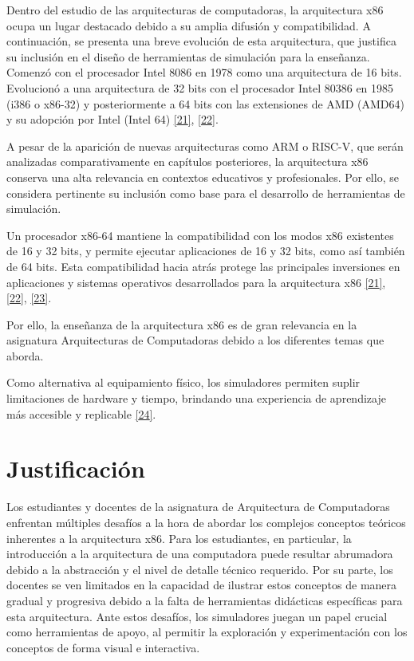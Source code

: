 \documentclass[12pt,oneside]{templates/unerthesis}
\begin{document}
Dentro del estudio de las arquitecturas de computadoras, la arquitectura x86 ocupa un lugar destacado debido a su amplia difusión y compatibilidad. A continuación, se presenta una breve evolución de esta arquitectura, que justifica su inclusión en el diseño de herramientas de simulación para la enseñanza. Comenzó con el procesador Intel 8086 en 1978 como una arquitectura de 16 bits. Evolucionó a una arquitectura de 32 bits con el procesador Intel 80386 en 1985 (i386 o x86-32) y posteriormente a 64 bits con las extensiones de AMD (AMD64) y su adopción por Intel (Intel 64) \protect\hyperlink{ref-intel_64_2025}{{[}21{]}}, \protect\hyperlink{ref-amd_developer_2024}{{[}22{]}}.

A pesar de la aparición de nuevas arquitecturas como ARM o RISC-V, que serán analizadas comparativamente en capítulos posteriores, la arquitectura x86 conserva una alta relevancia en contextos educativos y profesionales. Por ello, se considera pertinente su inclusión como base para el desarrollo de herramientas de simulación.

Un procesador x86-64 mantiene la compatibilidad con los modos x86 existentes de 16 y 32 bits, y permite ejecutar aplicaciones de 16 y 32 bits, como así también de 64 bits. Esta compatibilidad hacia atrás protege las principales inversiones en aplicaciones y sistemas operativos desarrollados para la arquitectura x86 \protect\hyperlink{ref-intel_64_2025}{{[}21{]}}, \protect\hyperlink{ref-amd_developer_2024}{{[}22{]}}, \protect\hyperlink{ref-abel_ibm_2000}{{[}23{]}}.

Por ello, la enseñanza de la arquitectura x86 es de gran relevancia en la asignatura Arquitecturas de Computadoras debido a los diferentes temas que aborda.

Como alternativa al equipamiento físico, los simuladores permiten suplir limitaciones de hardware y tiempo, brindando una experiencia de aprendizaje más accesible y replicable \protect\hyperlink{ref-skrien_cpu_2001}{{[}24{]}}.

\hypertarget{justificaciuxf3n}{%
\section{Justificación}\label{justificaciuxf3n}}

Los estudiantes y docentes de la asignatura de Arquitectura de Computadoras enfrentan múltiples desafíos a la hora de abordar los complejos conceptos teóricos inherentes a la arquitectura x86. Para los estudiantes, en particular, la introducción a la arquitectura de una computadora puede resultar abrumadora debido a la abstracción y el nivel de detalle técnico requerido. Por su parte, los docentes se ven limitados en la capacidad de ilustrar estos conceptos de manera gradual y progresiva debido a la falta de herramientas didácticas específicas para esta arquitectura. Ante estos desafíos, los simuladores juegan un papel crucial como herramientas de apoyo, al permitir la exploración y experimentación con los conceptos de forma visual e interactiva.
\end{document}
